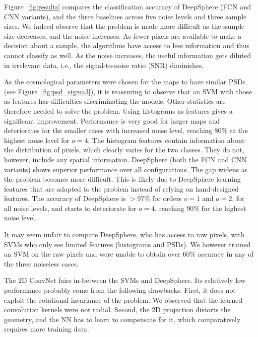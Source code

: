 \documentclass[final,twocolumn,3p,times,sort&compress]{elsarticle}
\newcommand{\figref}[1]{Figure~\ref{fig:#1}}
\newcommand{\1}{\b{1}}              %
\newcommand{\0}{\b{0}}              %
\begin{document}
\figref{results} compares the classification accuracy of DeepSphere (FCN and CNN variants), and the three baselines across five noise levels and three sample sizes.
We indeed observe that the problem is made more difficult as the sample size decreases, and the noise increases.
As fewer pixels are available to make a decision about a sample, the algorithms have access to less information and thus cannot classify as well.
As the noise increases, the useful information gets diluted in irrelevant data, i.e., the signal-to-noise ratio (SNR) diminishes.

As the cosmological parameters were chosen for the maps to have similar PSDs (see \figref{psd_sigma3}), it is reassuring to observe that an SVM with those as features has difficulties discriminating the models.
Other statistics are therefore needed to solve the problem. Using histograms as features gives a significant improvement.
Performance is very good for larger maps and deteriorates for the smaller cases with increased noise level, reaching 80\% at the highest noise level for $o=4$.
The histogram features contain information about the distribution of pixels, which clearly varies for the two classes.
They do not, however, include any spatial information.
DeepSphere (both the FCN and CNN variants) shows superior performance over all configurations.
The gap widens as the problem becomes more difficult.
This is likely due to DeepSphere learning features that are adapted to the problem instead of relying on hand-designed features.
The accuracy of DeepSphere is $>97\%$ for orders $o=1$ and $o=2$, for all noise levels, and starts to deteriorate for $o=4$, reaching 90\% for the highest noise level.

It may seem unfair to compare DeepSphere, who has access to raw pixels, with SVMs who only see limited features (histograms and PSDs).
We however trained an SVM on the raw pixels and were unable to obtain over $60\%$ accuracy in any of the three noiseless cases.

The 2D ConvNet fairs in-between the SVMs and DeepSphere.
Its relatively low performance probably come from the following drawbacks.
First, it does not exploit the rotational invariance of the problem.
We observed that the learned convolution kernels were not radial.
Second, the 2D projection distorts the geometry, and the NN has to learn to compensate for it, which comparatively requires more training data.
\end{document}
